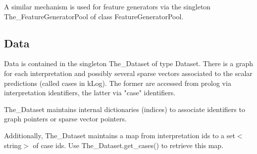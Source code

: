 A similar mechanism is used for feature generators via the
singleton The_FeatureGeneratorPool of class FeatureGeneratorPool.

\subsection{Data}

Data is contained in the singleton The_Dataset of type
Dataset. There is a graph for each interpretation and possibly
several sparse vectors associated to the scalar predictions (called
cases in kLog). The former are accessed from prolog via
interpretation identifiers, the latter via "case" identifiers.

The_Dataset maintains internal dictionaries (indices) to
associate identifiers to graph pointers or sparse vector pointers.

Additionally, The_Dataset maintains a map from interpretation ids
to a set$<$string$>$ of case ids. Use The_Dataset.get_cases() to
retrieve this map.\vspace{0.7cm}

